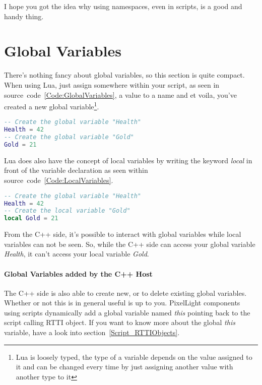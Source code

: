 I hope you got the idea why using namespaces, even in scripts, is a good and handy thing.




\section{Global Variables}
\label{Script_GlobalVariables}
There's nothing fancy about global variables, so this section is quite compact. When using Lua, just assign somewhere within your script, as seen in source~code~\ref{Code:GlobalVariables}, a value to a name and et voila, you've created a new global variable\footnote{Lua is loosely typed, the type of a variable depends on the value assigned to it and can be changed every time by just assigning another value with another type to it}.
\begin{lstlisting}[language=lua,float=htb,label=Code:GlobalVariables,caption={Global variables}]
-- Create the global variable "Health"
Health = 42
-- Create the global variable "Gold"
Gold = 21
\end{lstlisting}

Lua does also have the concept of local variables by writing the keyword \emph{local} in front of the variable declaration as seen within source~code~\ref{Code:LocalVariables}.
\begin{lstlisting}[language=lua,float=htb,label=Code:LocalVariables,caption={Local variables}]
-- Create the global variable "Health"
Health = 42
-- Create the local variable "Gold"
local Gold = 21
\end{lstlisting}
From the C++ side, it's possible to interact with global variables while local variables can not be seen. So, while the C++ side can access your global variable \emph{Health}, it can't access your local variable \emph{Gold}.


\paragraph{Global Variables added by the C++ Host}
The C++ side is also able to create new, or to delete existing global variables. Whether or not this is in general useful is up to you. PixelLight components using scripts dynamically add a global variable named \emph{this} pointing back to the script calling \ac{RTTI} object. If you want to know more about the global \emph{this} variable, have a look into section~\ref{Script_RTTIObjects}.





